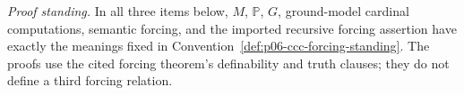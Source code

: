
\noindent\textit{Proof standing.}  In all three items below, \(M\),
\(\mathbb P\), \(G\), ground-model cardinal computations, semantic forcing,
and the imported recursive forcing assertion have exactly the meanings fixed
in Convention~\ref{def:p06-ccc-forcing-standing}.  The proofs use the cited
forcing theorem's definability and truth clauses; they do not define a third
forcing relation.

